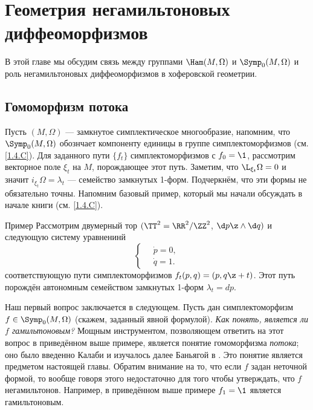 \chapter[Негамильтоновы диффеоморфизмы]{Геометрия негамильтоновых диффеоморфизмов}\label{chap:14}

В этой главе мы обсудим связь между группами $\Ham(M,\Omega)$ и $\Symp_0(M,\Omega)$ и роль негамильтоновых диффеоморфизмов в хоферовской геометрии.

\section{Гомоморфизм потока}\label{sec:14.1}

Пусть $(M,\Omega)$ — замкнутое симплектическое многообразие,
напомним, что $\Symp_0(M,\Omega)$ обознчает компоненту единицы в
группе симплектоморфизмов (см. \ref{1.4.C}).
Для заданного пути $\{f_t\}$ симплектоморфизмов с $f_0 = \1$,
рассмотрим векторное поле $\xi_t$ на $M$, порождающее этот путь.
Заметим, что $\L_{\xi_t}\Omega=0$ и значит
$i_{\xi_t}\Omega=\lambda_t$ — семейство замкнутых 1-форм.
Подчеркнём, что эти формы не обязательно точны.
Напомним базовый пример, который мы начали обсуждать в начале книги
(см. \ref{1.4.C}). 


\begin{thm}{Пример}\label{14.1.A}
Рассмотрим двумерный тор $(\TT^2=\RR^2/\ZZ^2$, $\d p\z\wedge \d q)$ и
следующую систему уравненинй 
\[
\begin{cases}
\quad\dot p=0,
\\
\quad\dot q=1.
\end{cases}
\]
соответствующую пути симплектоморфизмов $f_t(p, q) = (p, q \z+ t)$.
Этот путь порождён автономным семейством замкнутых 1-форм $\lambda_t = dp$.
\end{thm}


Наш первый вопрос заключается в следующем.
Пусть дан симплектоморфизм $f\in\Symp_0(M,\Omega)$ (скажем, заданный
явной формулой).
\textit{Как понять, является ли $f$ гамильтоновым?}
Мощным инструментом, позволяющем ответить на этот вопрос в приведённом
выше примере, является понятие гомоморфизма \emph{потока}; оно было
введенно Калаби и изучалось далее
Баньягой в \cite{B1}.
Это понятие является предметом настоящей главы.
Обратим внимание на то, что если $f$ задан неточной формой, то вообще
говоря этого недостаточно для того чтобы утверждать, что $f$
негамильтонов.
Например, в приведённом выше примере $f_1 = \1$ является гамильтоновым.

